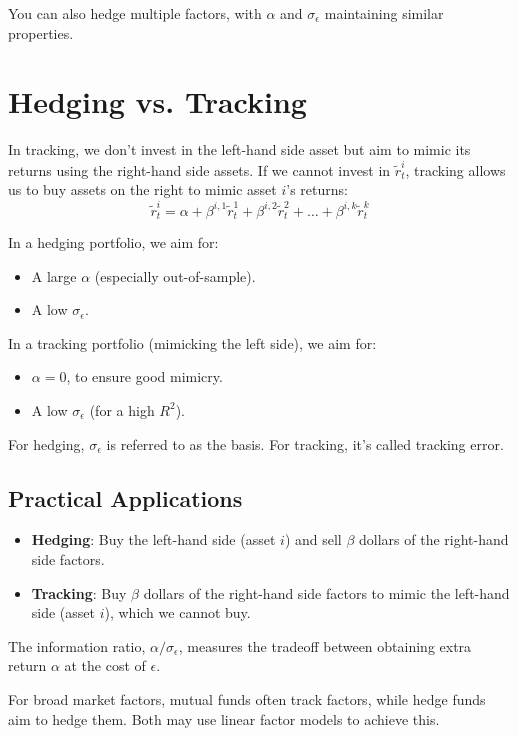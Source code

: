 \documentclass{article}
\begin{document}
You can also hedge multiple factors, with $\alpha$ and $\sigma_\epsilon$ maintaining similar properties.

\section{Hedging vs. Tracking}
In tracking, we don't invest in the left-hand side asset but aim to mimic its returns using the right-hand side assets. If we cannot invest in $\tilde{r}_t^i$, tracking allows us to buy assets on the right to mimic asset $i$’s returns:
$$ \tilde{r}_t^i = \alpha + \beta^{i,1} \tilde{r}_t^1 + \beta^{i,2} \tilde{r}_t^2 + \dots + \beta^{i,k} \tilde{r}_t^k $$

In a hedging portfolio, we aim for:
\begin{itemize}
    \item A large $\alpha$ (especially out-of-sample).
    \item A low $\sigma_\epsilon$.
\end{itemize}

In a tracking portfolio (mimicking the left side), we aim for:
\begin{itemize}
    \item $\alpha = 0$, to ensure good mimicry.
    \item A low $\sigma_\epsilon$ (for a high $R^2$).
\end{itemize}

For hedging, $\sigma_\epsilon$ is referred to as the basis. For tracking, it's called tracking error.

\subsection{Practical Applications}
\begin{itemize}
    \item \textbf{Hedging}: Buy the left-hand side (asset $i$) and sell $\beta$ dollars of the right-hand side factors.
    \item \textbf{Tracking}: Buy $\beta$ dollars of the right-hand side factors to mimic the left-hand side (asset $i$), which we cannot buy.
\end{itemize}

The information ratio, $\alpha / \sigma_\epsilon$, measures the tradeoff between obtaining extra return $\alpha$ at the cost of $\epsilon$.

For broad market factors, mutual funds often track factors, while hedge funds aim to hedge them. Both may use linear factor models to achieve this.
\end{document}
